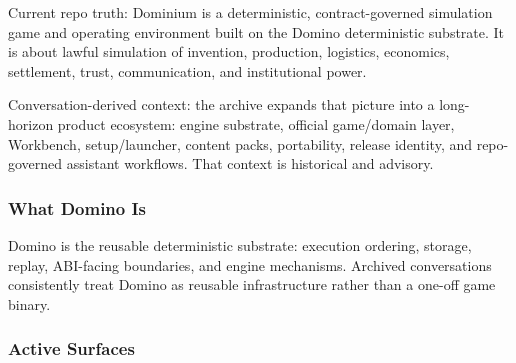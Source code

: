 \documentclass[9pt,a4paper,openany]{book}
\begin{document}
Current repo truth: Dominium is a deterministic, contract-\allowbreak{}governed simulation game and operating environment built on the Domino deterministic substrate.\allowbreak{} It is about lawful simulation of invention, production, logistics, economics, settlement, trust, communication, and institutional power.\allowbreak{}


Conversation-\allowbreak{}derived context: the archive expands that picture into a long-\allowbreak{}horizon product ecosystem: engine substrate, official game/\allowbreak{}domain layer, Workbench, setup/\allowbreak{}launcher, content packs, portability, release identity, and repo-\allowbreak{}governed assistant workflows.\allowbreak{} That context is historical and advisory.\allowbreak{}


\subsubsection{What Domino Is}

Domino is the reusable deterministic substrate: execution ordering, storage, replay, ABI-\allowbreak{}facing boundaries, and engine mechanisms.\allowbreak{} Archived conversations consistently treat Domino as reusable infrastructure rather than a one-\allowbreak{}off game binary.\allowbreak{}


\subsubsection{Active Surfaces}
\end{document}

